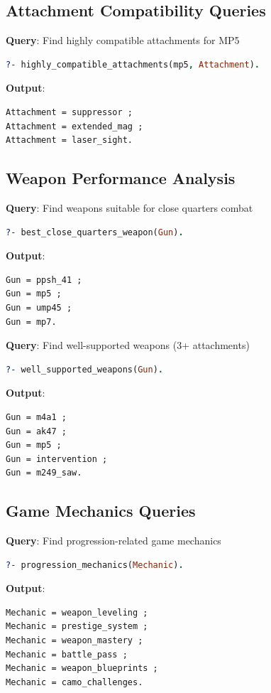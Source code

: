 \documentclass[12pt,a4paper]{article}
\begin{document}
\subsection{Attachment Compatibility Queries}

\textbf{Query}: Find highly compatible attachments for MP5
\begin{lstlisting}[language=Prolog]
?- highly_compatible_attachments(mp5, Attachment).
\end{lstlisting}

\textbf{Output}:
\begin{lstlisting}
Attachment = suppressor ;
Attachment = extended_mag ;
Attachment = laser_sight.
\end{lstlisting}

\subsection{Weapon Performance Analysis}

\textbf{Query}: Find weapons suitable for close quarters combat
\begin{lstlisting}[language=Prolog]
?- best_close_quarters_weapon(Gun).
\end{lstlisting}

\textbf{Output}:
\begin{lstlisting}
Gun = ppsh_41 ;
Gun = mp5 ;
Gun = ump45 ;
Gun = mp7.
\end{lstlisting}

\textbf{Query}: Find well-supported weapons (3+ attachments)
\begin{lstlisting}[language=Prolog]
?- well_supported_weapons(Gun).
\end{lstlisting}

\textbf{Output}:
\begin{lstlisting}
Gun = m4a1 ;
Gun = ak47 ;
Gun = mp5 ;
Gun = intervention ;
Gun = m249_saw.
\end{lstlisting}

\subsection{Game Mechanics Queries}

\textbf{Query}: Find progression-related game mechanics
\begin{lstlisting}[language=Prolog]
?- progression_mechanics(Mechanic).
\end{lstlisting}

\textbf{Output}:
\begin{lstlisting}
Mechanic = weapon_leveling ;
Mechanic = prestige_system ;
Mechanic = weapon_mastery ;
Mechanic = battle_pass ;
Mechanic = weapon_blueprints ;
Mechanic = camo_challenges.
\end{lstlisting}
\end{document}
